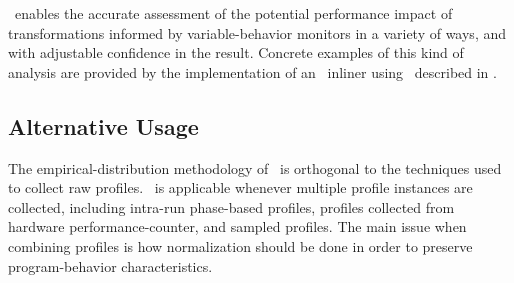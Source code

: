 %
%
\CP\ enables the accurate assessment of the
potential performance impact of transformations informed by
variable-behavior monitors in a variety of ways, and with adjustable
confidence in the result. Concrete examples of this kind of analysis
are provided by the implementation of an \FDO\ inliner using
\CP\ described in \cite{BerubePhD}.


\subsection{Alternative Usage}
\label{cp:extend}

The empirical-distribution methodology of \CP\ is orthogonal to the
techniques used to collect raw profiles.  \CP\ is applicable whenever
multiple profile instances are collected, including intra-run
phase-based profiles, profiles collected from hardware
performance-counter, and sampled profiles.  The main issue when
combining profiles is how normalization should be done in order to
preserve program-behavior characteristics.

